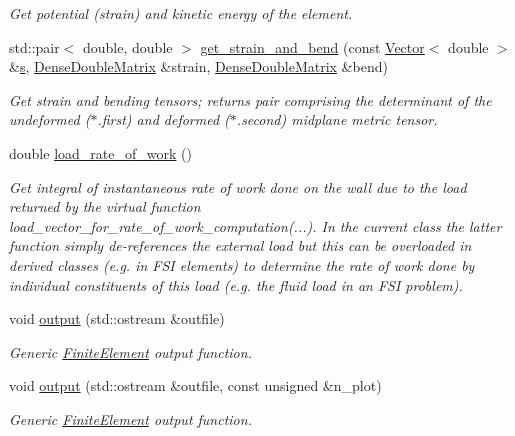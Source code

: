 \begin{DoxyCompactItemize}
\begin{DoxyCompactList}\small\item\em Get potential (strain) and kinetic energy of the element. \end{DoxyCompactList}\item 
std\+::pair$<$ double, double $>$ \hyperlink{classoomph_1_1KirchhoffLoveShellEquations_ad5a82826cad1b458c849e44114ea7d63}{get\+\_\+strain\+\_\+and\+\_\+bend} (const \hyperlink{classoomph_1_1Vector}{Vector}$<$ double $>$ \&\hyperlink{cfortran_8h_ab7123126e4885ef647dd9c6e3807a21c}{s}, \hyperlink{classoomph_1_1DenseDoubleMatrix}{Dense\+Double\+Matrix} \&strain, \hyperlink{classoomph_1_1DenseDoubleMatrix}{Dense\+Double\+Matrix} \&bend)
\begin{DoxyCompactList}\small\item\em Get strain and bending tensors; returns pair comprising the determinant of the undeformed ($\ast$.first) and deformed ($\ast$.second) midplane metric tensor. \end{DoxyCompactList}\item 
double \hyperlink{classoomph_1_1KirchhoffLoveShellEquations_a98601ae4af61f4a3fa7159afeeec2535}{load\+\_\+rate\+\_\+of\+\_\+work} ()
\begin{DoxyCompactList}\small\item\em Get integral of instantaneous rate of work done on the wall due to the load returned by the virtual function load\+\_\+vector\+\_\+for\+\_\+rate\+\_\+of\+\_\+work\+\_\+computation(...). In the current class the latter function simply de-\/references the external load but this can be overloaded in derived classes (e.\+g. in F\+SI elements) to determine the rate of work done by individual constituents of this load (e.\+g. the fluid load in an F\+SI problem). \end{DoxyCompactList}\item 
void \hyperlink{classoomph_1_1KirchhoffLoveShellEquations_a78954c3bd74225e91c7433c0009860dc}{output} (std\+::ostream \&outfile)
\begin{DoxyCompactList}\small\item\em Generic \hyperlink{classoomph_1_1FiniteElement}{Finite\+Element} output function. \end{DoxyCompactList}\item 
void \hyperlink{classoomph_1_1KirchhoffLoveShellEquations_a5173eb461b8c893b0dc657aae90192c7}{output} (std\+::ostream \&outfile, const unsigned \&n\+\_\+plot)
\begin{DoxyCompactList}\small\item\em Generic \hyperlink{classoomph_1_1FiniteElement}{Finite\+Element} output function. \end{DoxyCompactList}\item 

\end{DoxyCompactItemize}
